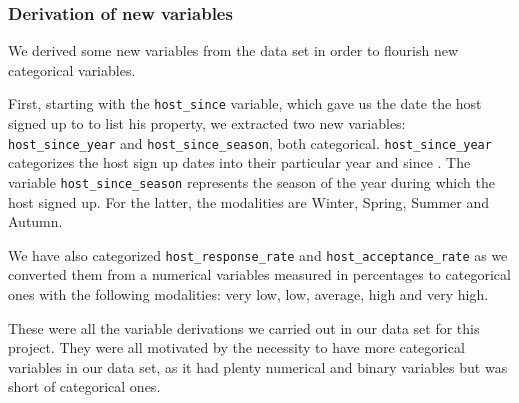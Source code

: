 \subsubsection{Derivation of new variables}
We derived some new variables from the data set in order to flourish new categorical variables.

First, starting with the \texttt{host\_since} variable, which gave us the date the host signed up to \airbnb
to list his property, we extracted two new variables: \texttt{host\_since\_year} and \texttt{host\_since\_season},
both categorical. \texttt{host\_since\_year} categorizes the host sign up dates into their particular year and since . 
The variable \texttt{host\_since\_season} represents the season of the year during which
the host signed up. For the latter, the modalities are Winter, Spring, Summer and Autumn.

We have also categorized \texttt{host\_response\_rate} and \texttt{host\_acceptance\_rate}
as we converted them from a numerical variables measured in percentages to 
categorical ones with the following modalities: very low, low, average, 
high and very high. 

These were all the variable derivations we carried out in our data set for this 
project. They were all motivated by the necessity to have more categorical
variables in our data set, as it had plenty numerical and binary variables
but was short of categorical ones.



